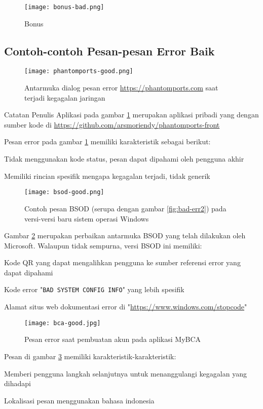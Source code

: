 \begin{figure}[H]
  \centering
  \texttt{[image: bonus-bad.png]}
  \caption{Bonus}
\end{figure}

\subsection{Contoh-contoh Pesan-pesan Error Baik}

\begin{figure}[H]
  \centering
  \texttt{[image: phantomports-good.png]}
  \caption{Antarmuka dialog pesan error
  \url{https://phantomports.com} saat terjadi kegagalan jaringan}
  \label{fig:good-err1}
\end{figure}
\begin{info}{Catatan Penulis}
  Aplikasi pada gambar \ref{fig:good-err1} merupakan aplikasi pribadi
  yang dengan sumber kode di
  \url{https://github.com/arsmoriendy/phantomports-front}
\end{info}
Pesan error pada gambar \ref{fig:good-err1} memiliki karakteristik
sebagai berikut:
\begin{pros}
\item Tidak menggunakan kode status, pesan dapat dipahami oleh pengguna akhir
\item Memiliki rincian spesifik mengapa kegagalan terjadi, tidak generik
\end{pros}

\begin{figure}[H]
  \centering
  \texttt{[image: bsod-good.png]}
  \caption{Contoh pesan BSOD (serupa dengan gambar
  \ref{fig:bad-err2}) pada versi-versi baru sistem operasi Windows}
  \label{fig:good-err2}
\end{figure}
Gambar \ref{fig:good-err2} merupakan perbaikan antarmuka BSOD yang
telah dilakukan oleh Microsoft. Walaupun tidak sempurna, versi BSOD
ini memiliki:
\begin{pros}
\item Kode QR yang dapat mengalihkan pengguna ke sumber referensi
  error yang dapat dipahami
\item Kode error "\texttt{BAD SYSTEM CONFIG INFO}" yang lebih spesifik
\item Alamat situs web dokumentasi error di
  "\url{https://www.windows.com/stopcode}"
\end{pros}

\begin{figure}[H]
  \centering
  \texttt{[image: bca-good.jpg]}
  \caption{Pesan error saat pembuatan akun pada aplikasi MyBCA}
  \label{fig:good-err3}
\end{figure}
Pesan di gambar \ref{fig:good-err3} memiliki karakteristik-karakteristik:
\begin{pros}
\item Memberi pengguna langkah selanjutnya untuk menanggulangi
  kegagalan yang dihadapi
\item Lokalisasi pesan menggunakan bahasa indonesia
\end{pros}

